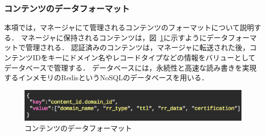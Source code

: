 \subsubsection{コンテンツのデータフォーマット}
本項では，マネージャにて管理されるコンテンツのフォーマットについて説明する．
マネージャに保持されるコンテンツは，図~\ref{fig:manager-provider}に示すようにデータフォーマットで管理される．
認証済みのコンテンツは，マネージャに転送された後，コンテンツIDをキーにドメイン名やレコードタイプなどの情報をバリューとしてデータベースで管理する．
データベースには，永続性と高速な読み書きを実現するインメモリのRedisというNoSQLのデータベースを用いる．

\begin{figure}[h]
 \centering
 \includegraphics[scale=0.6]{figure/content-file.png}
 \caption{コンテンツのデータフォーマット}
 \label{fig:manager-provider}
\end{figure}

%
